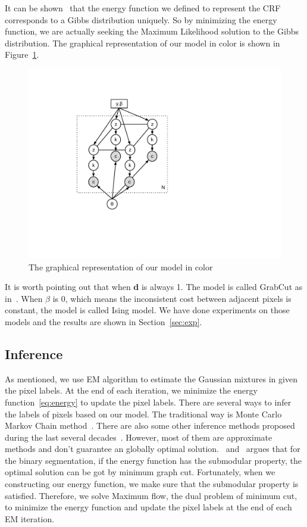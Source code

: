 \documentclass{article} %
\begin{document}
It can be shown~\citep{Geman1984Stochastic, Li2001Markov} that the
energy function we defined to represent the CRF corresponds to a
Gibbs distribution uniquely. So by minimizing the energy function, we
are actually seeking the Maximum Likelihood solution to the Gibbs
distribution. The graphical representation of our model in color is
shown in Figure~\ref{fig:mrf_model}.

\begin{figure}[h]
\begin{center}
\includegraphics[height=0.5\linewidth]{./fig/mrf_model.pdf}
\end{center}
\caption{The graphical representation of our model in color}
\label{fig:mrf_model}
\end{figure}

It is worth pointing out that when \textbf{d} is always 1. The model is
called GrabCut as in~\citep{Rother2004GrabCut}. When $\beta$ is 0,
which means the inconsistent cost between adjacent pixels is constant,
the model is called Ising model. We have done experiments on those
models and the results are shown in Section~\ref{sec:exp}.

\subsection{Inference}
As mentioned, we use EM algorithm to estimate the Gaussian mixtures in
given the pixel labels. At the end of each iteration, we minimize the
energy function~\eqref{eq:energy} to update the pixel labels. There
are several ways to infer the labels of pixels based on our model. The
traditional way is Monte Carlo Markov Chain
method~\citep{Bishop2006Pattern}. There are also some other inference
methods proposed during the last several
decades~\citep{Szeliski2008Comparative}. However, most of them are
approximate methods and don't guarantee an globally optimal
solution.~\citet{Boykov2001Fast} and~\citet{Boykov2006} argues that for the binary
segmentation, if the energy function has the submodular property, the
optimal solution can be got by minimum graph cut. Fortunately, when we
constructing our energy function, we make sure that the submodular
property is satisfied. Therefore, we solve Maximum flow, the dual
problem of minimum cut, to minimize the energy function and update the
pixel labels at the end of each EM iteration.
\end{document}
